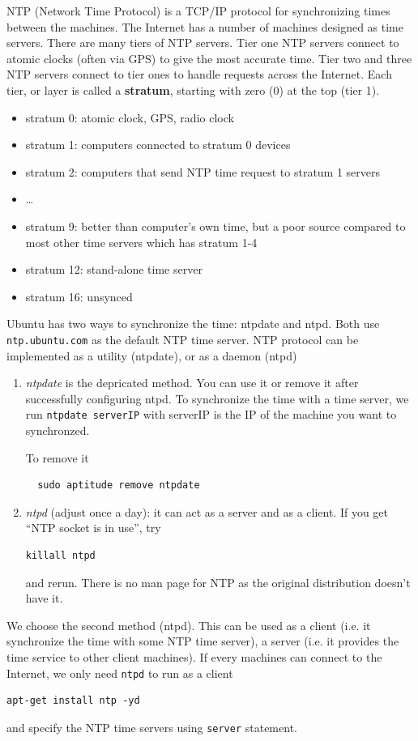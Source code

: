 NTP (Network Time Protocol) is a TCP/IP protocol for synchronizing times between
the machines. The Internet has a number of machines designed as time servers.
There are many tiers of NTP servers.
Tier one NTP servers connect to atomic clocks (often via GPS) to give the most
accurate time. Tier two and three NTP servers connect to tier ones to handle
requests across the Internet. Each tier, or layer is called a {\bf stratum},
starting with zero (0) at the top (tier 1). 
\begin{itemize}
  \item stratum 0: atomic clock, GPS, radio clock
  \item stratum 1: computers connected to stratum 0 devices
  \item stratum 2: computers that send NTP time request to stratum 1 servers
  \item \ldots
  \item stratum 9: better than computer's own time, but a poor source compared
  to most other time servers which has stratum 1-4
  \item stratum 12: stand-alone time server
  \item stratum 16: unsynced
\end{itemize}

Ubuntu has two ways to synchronize the time: ntpdate and ntpd. Both use
\verb!ntp.ubuntu.com! as the default NTP time server. NTP protocol can be
implemented as a utility (ntpdate), or as a daemon (ntpd)
\begin{enumerate}
  \item {\it ntpdate} is the depricated method. You can use it or remove it
  after successfully configuring ntpd.
  To synchronize the time with a time server, we run \verb!ntpdate serverIP!
  with serverIP is the IP of the machine you want to synchronzed.
  
  To remove it
  \begin{verbatim}
  sudo aptitude remove ntpdate
  \end{verbatim}
  
  \item {\it ntpd} (adjust once a day): it can act as a server and as a client.
  If you get ``NTP socket is in use'', try 
\begin{verbatim}
killall ntpd
\end{verbatim}
and rerun. There is no man page for NTP as the original distribution doesn't
have it.
\end{enumerate}

We choose the second method (ntpd).  This can be used as a client (i.e. it
synchronize the time with some NTP time server), a server (i.e. it provides the
time service to other client machines). If every machines can connect to the
Internet, we only need \verb!ntpd! to run as a client
\begin{verbatim}
apt-get install ntp -yd 
\end{verbatim}
and specify the NTP time servers using \verb!server! statement. 

